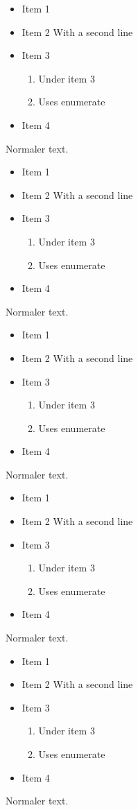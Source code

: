 \begin{itemize}
\item Item 1
\item Item 2
With a second line
\item Item 3
\begin{enumerate}
\item Under item 3
\item Uses enumerate
\end{enumerate}
\item Item 4
\end{itemize}
Normaler text.
\begin{itemize}
\item Item 1
\item Item 2
With a second line
\item Item 3
\begin{enumerate}
\item Under item 3
\item Uses enumerate
\end{enumerate}
\item Item 4
\end{itemize}
Normaler text.
\begin{itemize}
\item Item 1
\item Item 2
With a second line
\item Item 3
\begin{enumerate}
\item Under item 3
\item Uses enumerate
\end{enumerate}
\item Item 4
\end{itemize}
Normaler text.
\begin{frame}[t]
\begin{itemize}
\item Item 1
\item Item 2
With a second line
\item Item 3
\begin{enumerate}
\item Under item 3
\item Uses enumerate
\end{enumerate}
\item Item 4
\end{itemize}
Normaler text.
\end{frame}

\begin{frame}[t]
\begin{itemize}
\item Item 1
\item Item 2
With a second line
\item Item 3
\begin{enumerate}
\item Under item 3
\item Uses enumerate
\end{enumerate}
\item Item 4
\end{itemize}
Normaler text.
\end{frame}

